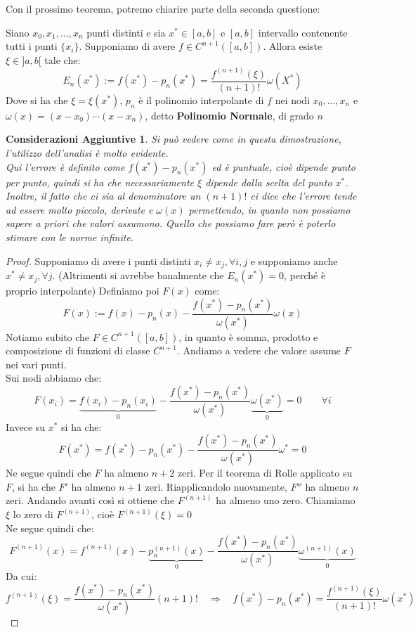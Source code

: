 \documentclass[11pt,a4paper,twoside]{article}
\newtheorem*{cons}{Considerazioni Aggiuntive}
\theoremstyle{definition}
\begin{document}
Con il prossimo teorema, potremo chiarire parte della seconda questione:

\begin{thm}{}{}
	Siano $x_0,x_1,...,x_n$ punti distinti e sia $x^* \in [a,b]$ e $[a,b]$ intervallo contenente tutti i punti $\{x_i\}$. Supponiamo di avere $f \in C^{n+1}([a,b])$. Allora esiste $\xi \in ]a,b[$ tale che:
	\[E_n(x^*) := f(x^*) - p_n(x^*) = \frac{f^{(n+1)}(\xi)}{(n+1)!}\omega(X^*)\]
	Dove si ha che $\xi = \xi(x^*)$, $p_n$ è il polinomio interpolante di $f$ nei nodi $x_0,...,x_n$ e $\omega(x) = (x-x_0)\cdots(x-x_n)$, detto \textbf{Polinomio Normale}, di grado $n$
\end{thm}

\begin{cons}
	Si può vedere come in questa dimostrazione, l'utilizzo dell'analisi è molto evidente.\\
	Qui l'errore è definito come $f(x^*)-p_n(x^*)$ ed è puntuale, cioè dipende punto per punto, quindi si ha che necessariamente $\xi$ dipende dalla scelta del punto $x^*$. Inoltre, il fatto che ci sia al denominatore un $(n+1)!$ ci dice che l'errore tende ad essere molto piccolo, derivate e $\omega(x)$ permettendo, in quanto non possiamo sapere a priori che valori assumono. Quello che possiamo fare però è poterlo stimare con le norme infinite.
\end{cons}

\begin{proof}
	Supponiamo di avere i punti distinti $x_i\neq x_j, \forall i,j$ e supponiamo anche $x^* \neq x_j, \forall j$. (Altrimenti si avrebbe banalmente che $E_n(x^*)=0$, perché è proprio interpolante)
	Definiamo poi $F(x)$ come:
	\[F(x) := f(x) - p_n(x) - \frac{f(x^*) - p_n(x^*)}{\omega(x^*)}\omega(x)\]
	Notiamo subito che $F \in C^{n+1}([a,b])$, in quanto è somma, prodotto e composizione di funzioni di classe $C^{n+1}$. Andiamo a vedere che valore assume $F$ nei vari punti.\\
	Sui nodi abbiamo che:
	\[ F(x_i) = \underbrace{f(x_i) - p_n(x_i)}_0 - \frac{f(x^*) - p_n(x^*)}{\omega(x^*)} \underbrace{\omega(x^*)}_0 = 0 \qquad \forall i\]
	Invece su $x^*$ si ha che:
	\[ F(x^*) = f(x^*) - p_n(x^*) -\frac{f(x^*) - p_n(x^*)}{\omega(x^*)}\omega^* = 0 \]
	Ne segue quindi che $F$ ha almeno $n+2$ zeri. Per il teorema di Rolle applicato su $F$, si ha che $F'$ ha almeno $n+1$ zeri. Riapplicandolo nuovamente, $F''$ ha almeno $n$ zeri. Andando avanti così si ottiene che $F^{(n+1)}$ ha almeno uno zero. Chiamiamo $\xi$ lo zero di $F^{(n+1)}$, cioè $F^{(n+1)}(\xi) = 0$\\
	Ne segue quindi che:
	\[ F^{(n+1)}(x) = f^{(n+1)}(x) - \underbrace{p_n^{(n+1)}(x)}_0 - \frac{f(x^*) - p_n(x^*)}{\omega(x^*)} \underbrace{\omega^{(n+1)}(x)}_0\]
	Da cui:
	\[ f^{(n+1)}(\xi) = \frac{f(x^*) - p_n(x^*)}{\omega(x^*)} (n+1)! \quad \Rightarrow \quad f(x^*)-p_n(x^*) = \frac{f^{(n+1)}(\xi)}{(n+1)!} \omega(x^*) \]
\end{proof}
\end{document}

